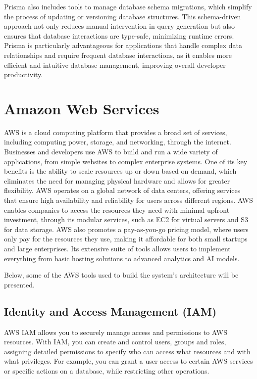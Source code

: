 Prisma also includes tools to manage database schema migrations, which simplify the process of updating or versioning database structures. This schema-driven approach not only reduces manual intervention in query generation but also ensures that database interactions are type-safe, minimizing runtime errors. Prisma is particularly advantageous for applications that handle complex data relationships and require frequent database interactions, as it enables more efficient and intuitive database management, improving overall developer productivity.

\section{Amazon Web Services}
\acf{AWS} is a cloud computing platform that provides a broad set of services, including computing power, storage, and networking, through the internet. Businesses and developers use \ac{AWS} to build and run a wide variety of applications, from simple websites to complex enterprise systems. One of its key benefits is the ability to scale resources up or down based on demand, which eliminates the need for managing physical hardware and allows for greater flexibility. \ac{AWS} operates on a global network of data centers, offering services that ensure high availability and reliability for users across different regions. \ac{AWS} enables companies to access the resources they need with minimal upfront investment, through its modular services, such as \ac{EC2} for virtual servers and \ac{S3} for data storage. \ac{AWS} also promotes a pay-as-you-go pricing model, where users only pay for the resources they use, making it affordable for both small startups and large enterprises. Its extensive suite of tools allows users to implement everything from basic hosting solutions to advanced analytics and AI models.

Below, some of the \ac{AWS} tools used to build the system's architecture will be presented.
\subsection{Identity and Access Management (IAM)}
\ac{AWS} \ac{IAM} allows you to securely manage access and permissions to \ac{AWS} resources. With \ac{IAM}, you can create and control users, groups and roles, assigning detailed permissions to specify who can access what resources and with what privileges. For example, you can grant a user access to certain \ac{AWS} services or specific actions on a database, while restricting other operations.

